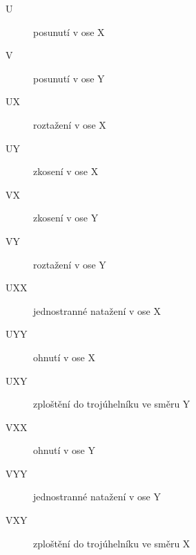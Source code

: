 \documentclass[a4paper,12pt]{article}
\begin{document}
\begin{description}
\begin{description}
\item[U] posunutí v ose X
\item[V] posunutí v ose Y
\item[UX] roztažení v ose X
\item[UY] zkosení v ose X
\item[VX] zkosení v ose Y
\item[VY] roztažení v ose Y
\item[UXX] jednostranné natažení v ose X
\item[UYY] ohnutí v ose X
\item[UXY] zploštění do trojúhelníku ve směru Y
\item[VXX] ohnutí v ose Y
\item[VYY] jednostranné natažení v ose Y
\item[VXY] zploštění do trojúhelníku ve směru X
\end{description}
\end{description}
\newpage
\end{document}
